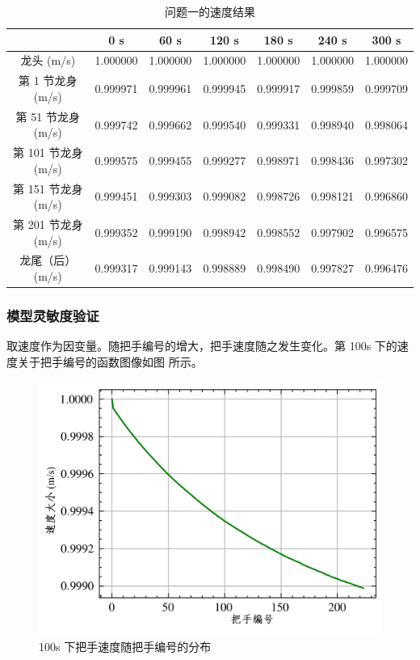\documentclass[a4paper]{article}
\begin{document}
		\begin{table}[H] %
		\captionsetup{skip=4pt} %
		\caption{问题一的速度结果}
		\centering
		\setlength{\arrayrulewidth}{0.5pt} %
		\begin{tabular}{|c|c|c|c|c|c|c|} %
			\hline
			& 0 s & 60 s & 120 s & 180 s & 240 s & 300 s \\ \hline
			龙头 (m/s)      &    1.000000 &	1.000000 &	1.000000 &	1.000000 &	1.000000 &	1.000000 \\ \hline
			第 1 节龙身 (m/s) &  0.999971 &	0.999961 &	0.999945 &	0.999917 &	0.999859 &	0.999709 \\ \hline
			第 51 节龙身 (m/s) & 0.999742 &	0.999662 &	0.999540 &	0.999331 &	0.998940 &	0.998064 \\ \hline
			第 101 节龙身 (m/s) &0.999575 &	0.999455 &	0.999277 &	0.998971 &	0.998436 &	0.997302 \\ \hline
			第 151 节龙身 (m/s) &0.999451 &	0.999303 &	0.999082 &	0.998726 &	0.998121 &	0.996860 \\ \hline
			第 201 节龙身 (m/s) &0.999352 &	0.999190 &	0.998942 &	0.998552 &	0.997902 &	0.996575 \\ \hline
			龙尾（后） (m/s) &   0.999317 &	0.999143 &	0.998889 &	0.998490 &	0.997827 &	0.996476 \\ \hline
		\end{tabular}
		\end{table}
		
		\subsubsection{模型灵敏度验证}
		
		取速度作为因变量。随把手编号的增大，把手速度随之发生变化。第 100s 下的速度关于把手编号的函数图像如图%
		所示。
		
		\begin{figure}[H]
			\centering
			\includegraphics[width=0.5\linewidth]{image/Figure_5131.png}
			\caption{100s 下把手速度随把手编号的分布}
			\label{Figure_5131}
		\end{figure}
		
\end{document}
